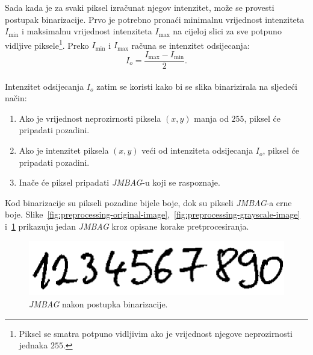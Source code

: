 Sada kada je za svaki piksel izračunat njegov intenzitet, može se provesti postupak binarizacije. Prvo je potrebno
pronaći minimalnu vrijednost intenziteta $I_{\min}$ i maksimalnu vrijednost intenziteta $I_{\max}$ na cijeloj slici za
sve potpuno vidljive piksele\footnote{Piksel se smatra potpuno vidljivim ako je vrijednost njegove neprozirnosti
jednaka $255$.}. Preko $I_{\min}$ i $I_{\max}$ računa se intenzitet odsijecanja:\\
\begin{equation*}
    I_{o} = \frac{I_{\max} - I_{\min}}{2}.
\end{equation*}\\
Intenzitet odsijecanja $I_{o}$ zatim se koristi kako bi se slika binarizirala na sljedeći način:
\begin{enumerate}
    \item Ako je vrijednost neprozirnosti piksela $(x, y)$ manja od $255$, piksel će pripadati pozadini.
    \item Ako je intenzitet piksela $(x, y)$ veći od intenziteta odsijecanja $I_{o}$, piksel će pripadati pozadini.
    \item Inače će piksel pripadati \emph{JMBAG}-u koji se raspoznaje.
\end{enumerate}
Kod binarizacije su pikseli pozadine bijele boje, dok su pikseli \emph{JMBAG}-a crne boje.
Slike\ \ref{fig:preprocessing-original-image},\ \ref{fig:preprocessing-grayscale-image}
i\ \ref{fig:preprocessing-binarized-image} prikazuju jedan \emph{JMBAG} kroz opisane korake pretprocesiranja.
\begin{figure}[htb]
    \centering
    \includegraphics[width=12cm]{images/chapter4/preprocessing-binarized-image.png}
    \caption{\emph{JMBAG} nakon postupka binarizacije.}
    \label{fig:preprocessing-binarized-image}
\end{figure}


